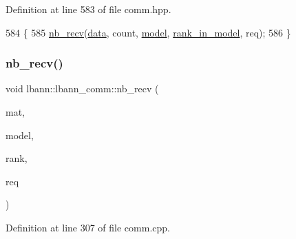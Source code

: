 Definition at line 583 of file comm.\+hpp.


\begin{DoxyCode}
584                                                            \{
585     \hyperlink{classlbann_1_1lbann__comm_aac24e8802602c73efddb455274e158f4}{nb\_recv}(\hyperlink{namespacelbann_1_1cnpy__utils_a9ac86d96ccb1f8b4b2ea16441738781f}{data}, count, \hyperlink{namespacelbann_adee41f31f15f3906cbdcce4a1417eb56a20f35e630daf44dbfa4c3f68f5399d8c}{model}, \hyperlink{classlbann_1_1lbann__comm_a0dcccd57c2b591eb7682e192e0a09033}{rank\_in\_model}, req);
586   \}
\end{DoxyCode}
\mbox{\label{classlbann_1_1lbann__comm_a8f850662e84e3efab19244d1ef6752d7}} 
\subsubsection{\texorpdfstring{nb\+\_\+recv()}{nb\_recv()}\hspace{0.1cm}{\footnotesize\ttfamily [3/9]}}
{\footnotesize\ttfamily void lbann\+::lbann\+\_\+comm\+::nb\+\_\+recv (\begin{DoxyParamCaption}\item[{\hyperlink{base_8hpp_a68f11fdc31b62516cb310831bbe54d73}{Mat} \&}]{mat,  }\item[{int}]{model,  }\item[{int}]{rank,  }\item[{El\+::mpi\+::\+Request$<$ Data\+Type $>$ \&}]{req }\end{DoxyParamCaption})}



Definition at line 307 of file comm.\+cpp.


